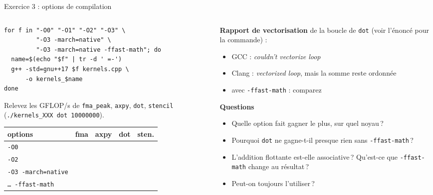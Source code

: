 \documentclass[8pt,aspectratio=169]{beamer}
\begin{document}
\begin{frame}[fragile]{Exercice 3 : options de compilation}
\begin{columns}[T]
\begin{column}{0.52\textwidth}
\begin{verbatim}
for f in "-O0" "-O1" "-O2" "-O3" \
         "-O3 -march=native" \
         "-O3 -march=native -ffast-math"; do
  name=$(echo "$f" | tr -d ' =-')
  g++ -std=gnu++17 $f kernels.cpp \
      -o kernels_$name
done
\end{verbatim}
Relevez les GFLOP/s de \texttt{fma\_peak}, \texttt{axpy}, \texttt{dot}, \texttt{stencil} (\texttt{./kernels\_XXX dot 10000000}).

\medskip
\begin{tabular}{@{}L{3.2cm}cccc@{}}
\toprule
options & fma & axpy & dot & sten.\\
\midrule
\texttt{-O0} & & & &\\
\texttt{-O2} & & & &\\
\texttt{-O3 -march=native} & & & &\\
\texttt{\dots{} -ffast-math} & & & &\\
\bottomrule
\end{tabular}
\end{column}
\begin{column}{0.44\textwidth}
\textbf{Rapport de vectorisation} de la boucle de \texttt{dot} (voir l'énoncé pour la commande) :
\begin{itemize}
\item GCC : \emph{couldn't vectorize loop}
\item Clang : \emph{vectorized loop}, mais la somme reste ordonnée
\item avec \texttt{-ffast-math} : comparez
\end{itemize}

\medskip
\textbf{Questions}
\begin{itemize}
\item Quelle option fait gagner le plus, sur quel noyau\,?
\item Pourquoi \texttt{dot} ne gagne-t-il presque rien sans \texttt{-ffast-math}\,?
\item L'addition flottante est-elle associative\,? Qu'est-ce que \texttt{-ffast-math} change au résultat\,?
\item Peut-on toujours l'utiliser\,?
\end{itemize}
\end{column}
\end{columns}
\end{frame}
\end{document}
